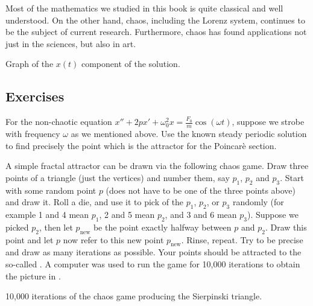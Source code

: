 Most of the mathematics we studied in this book is quite classical and
well understood.
On the other hand, chaos, including the Lorenz system, continues to be the
subject of current research.
Furthermore, chaos has found applications not just in the sciences, but
also in art.

\begin{myfig}
\capstart
{}
\caption{Graph of the $x(t)$ component of the solution.
\label{nlin:lorenz-graphx}}
\end{myfig}

\subsection{Exercises}

\begin{samepage}
\begin{exercise}
For the non-chaotic equation
$x''+2p x' + \omega_0^2 x = \frac{F_0}{m} \cos (\omega t)$, suppose we
strobe with frequency $\omega$ as we mentioned above.  Use the known
steady periodic solution to find precisely the point which is the attractor
for the Poincar\`e section.
\end{exercise}
\end{samepage}

\begin{samepage}
\begin{exercise}[project]
A simple fractal attractor can be drawn via the following chaos game.  Draw three
points of a triangle (just the vertices) and number them, say $p_1$, $p_2$
and $p_3$.  Start with some
random point $p$ (does not have to be one of the three points above) and
draw it.  Roll a die, and use it to pick of the $p_1$, $p_2$, or $p_3$
randomly (for example 1 and 4 mean $p_1$, 2 and 5 mean $p_2$, and 3 and 6
mean $p_3$).  Suppose we picked $p_2$, then let $p_{\text{new}}$ be the
point exactly halfway between $p$ and $p_2$.  Draw this point and let $p$
now refer to this new point $p_{\text{new}}$.  Rinse, repeat.  Try to be
precise and draw as many iterations as possible.  Your points should be
attracted to the so-called \emph{}.  A computer
was used to run the game for 10,000 iterations to obtain the picture in
.
\end{exercise}
\end{samepage}

\begin{myfig}
\capstart
{}
\caption{10,000 iterations of the chaos game producing the 
Sierpinski triangle. \label{nlin:sierpinski}}
\end{myfig}

